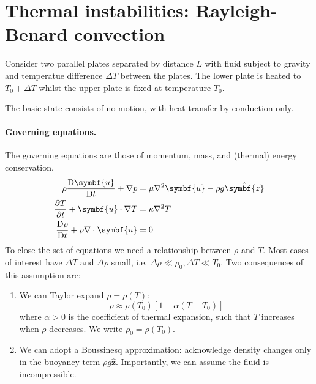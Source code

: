 \documentclass{jknotes}
\renewcommand{\u}{\symbf{u}}
\begin{document}
\section{Thermal instabilities: Rayleigh-Benard convection}
Consider two parallel plates separated by distance $L$ with fluid subject to
gravity and temperatue difference $\Delta T$ between the plates. The lower
plate is heated to $T_0 + \Delta T$ whilst the upper plate is fixed at
temperature $T_0$. 
\begin{center}
\end{center}

The basic state consists of no motion, with heat transfer by conduction only.
\paragraph{Governing equations.}
The governing equations are those of momentum, mass, and (thermal) energy
conservation.
\begin{align}
	\rho \frac{\diffD \u}{\diffD t} + \nabla p &= \mu \nabla^2 \u - \rho g
	\hat{\symbf{z}} \\
	\frac{\partial T}{\partial t} + \u \cdot \nabla T &= \kappa \nabla^2 T \\
	\frac{\diffD \rho}{\diffD t} + \rho \nabla \cdot \u &= 0
\end{align}
To close the set of equations we need a relationship between $\rho$ and $T$.
Most cases of interest have $\Delta T$ and $\Delta \rho$ small, i.e. $\Delta
\rho \ll \rho_0, \Delta T \ll T_0$. Two consequences of this assumption are:
\begin{enumerate}
	\item We can Taylor expand $\rho = \rho(T)$:
		\begin{equation}
			\rho \approx \rho(T_0) \left[ 1 - \alpha(T-T_0)\right]
		\end{equation}
		where $\alpha > 0$ is the coefficient of thermal expansion, such that
		$T$ increases when $\rho$ decreases. We write $\rho_0 = \rho(T_0)$.
	\item We can adopt a Boussinesq approximation: acknowledge density changes
		only in the buoyancy term $\rho g \hat{\symbf{z}}$. Importantly, we
		can assume the fluid is incompressible.
\end{enumerate}
\end{document}
